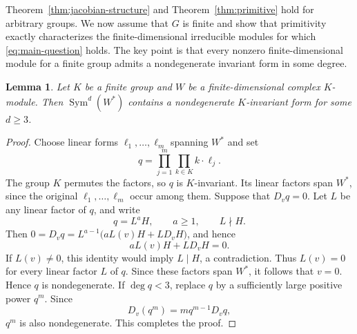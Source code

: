 \documentclass[11pt,reqno]{amsart}
\numberwithin{equation}{section}
\newtheorem{lemma}[theorem]{Lemma}
\theoremstyle{definition}
\theoremstyle{remark}
\newcommand{\Sym}{\operatorname{Sym}}
\begin{document}
Theorem~\ref{thm:jacobian-structure} and
Theorem~\ref{thm:primitive} hold for arbitrary groups.  We now assume
that $G$ is finite and show that primitivity
exactly characterizes the finite-dimensional irreducible modules for which
\eqref{eq:main-question} holds. The key point is that every nonzero finite-dimensional module for a
finite group admits a nondegenerate invariant form in some degree. 


\begin{lemma}\label{lem:finite-nondegenerate-invariant}
Let $K$ be a finite group and $W$ be a  finite-dimensional  complex $K$-module. Then $\Sym^d(W^*)$ contains a nondegenerate $K$-invariant form for some $d\geq3$.
\end{lemma}

\begin{proof}
Choose linear forms $\ell_1,\ldots,\ell_m$ spanning $W^*$ and set
\[
  q=\prod_{j=1}^m\prod_{k\in K} k\cdot\ell_j.
\]
The group $K$ permutes the factors, so $q$ is $K$-invariant.  Its
linear factors span $W^*$, since the original
$\ell_1,\ldots,\ell_m$ occur among them. Suppose that $D_vq=0$.  Let $L$ be any linear factor of $q$, and
write
\[
  q=L^a H,
  \qquad a\geq1,\qquad L\nmid H.
\]
Then $0=D_vq
   =L^{a-1}\bigl(aL(v)H+L D_v H\bigr)$, and hence
\[
  aL(v)H+L D_v H=0.
\]
If $L(v)\ne0$, this identity would imply $L\mid H$, a contradiction.
Thus $L(v)=0$ for every linear factor $L$ of $q$.  Since these
factors span $W^*$, it follows that $v=0$.  Hence $q$ is
nondegenerate. If $\deg q<3$, replace $q$ by a sufficiently large positive power $q^m$.
Since
\[
  D_v(q^m)=m q^{m-1}D_vq,
\]
$q^m$ is also nondegenerate.  This completes the proof.
\end{proof}
\end{document}
